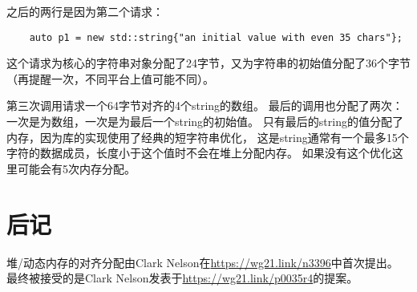 之后的两行是因为第二个请求：
\begin{lstlisting}
    auto p1 = new std::string{"an initial value with even 35 chars"};
\end{lstlisting}
这个请求为核心的字符串对象分配了24字节，又为字符串的初始值分配了36个字节
（再提醒一次，不同平台上值可能不同）。

第三次调用请求一个64字节对齐的4个string的数组。
最后的调用也分配了两次：一次是为数组，一次是为最后一个string的初始值。
只有最后的string的值分配了内存，因为库的实现使用了经典的短字符串优化，
这是string通常有一个最多15个字符的数据成员，长度小于这个值时不会在堆上分配内存。
如果没有这个优化这里可能会有5次内存分配。


\section{后记}
堆/动态内存的对齐分配由Clark Nelson在\url{https://wg21.link/n3396}中首次提出。
最终被接受的是Clark Nelson发表于\url{https://wg21.link/p0035r4}的提案。